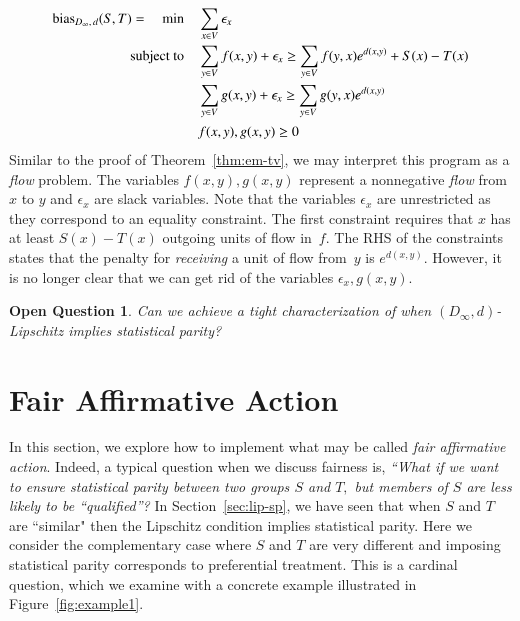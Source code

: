 \documentclass[letterpaper,11pt]{article}
\newcommand{\authnote}[2]{{ \footnotesize \bf{\color{red}[#1's Note: {\color{blue}#2}]}}}
\newcommand{\authnote}[2]{}
\newtheorem{open}{Open Question}[section]
\theoremstyle{definition}
\newcommand{\Mnote}[1]{{\authnote{Moritz} {#1}}}
\newcommand\bias{\mathrm{bias}}
\newcommand\dtoDinfty{D_\infty,\, d}
\begin{document}
\begin{align}
\bias_{\dtoDinfty}(S,T)
=
\quad\min\quad & \sum_{x\in V} \epsilon_x \notag \\
\label{eq:f}
\text{subject to}\quad
& \sum_{y\in V}f(x,y)+\epsilon_x
\ge \sum_{y\in V}f(y,x)e^{d(x,y)}+S(x)-T(x) \\
\label{eq:g}
& \sum_{y\in V}g(x,y)+\epsilon_x
\ge \sum_{y\in V}g(y,x)e^{d(x,y)} \\
& f(x,y),g(x,y)\ge0 \notag
\end{align}
%
Similar to the proof of Theorem~\ref{thm:em-tv}, we may interpret this program as
a \emph{flow} problem.  The variables $f(x,y), g(x,y)$ represent a
nonnegative \emph{flow} from $x$ to $y$ and
$\epsilon_x$ are slack variables. Note that the variables $\epsilon_x$ are
unrestricted as they correspond to an equality constraint. The first
constraint requires that $x$ has at least $S(x)-T(x)$ outgoing units of
flow in~$f.$ The
RHS of the constraints states that the penalty for \emph{receiving} a unit of
flow from~$y$ is $e^{d(x,y)}.$ However, it is no longer clear that we can
get rid of the variables $\epsilon_x,g(x,y).$

\begin{open}
Can we achieve a tight characterization of when $(D_\infty,d)$-Lipschitz
implies statistical parity?
\end{open}

\section{Fair Affirmative Action}
\label{sec:preferential}


In this section, we explore how to implement what may be called \emph{fair
affirmative action}. Indeed, a typical question when we discuss fairness
is, \emph{``What if we want to ensure statistical parity between two groups
$S$ and $T,$ but members of $S$ are less likely to be ``qualified''?}
In
Section~\ref{sec:lip-sp}, we have seen that when $S$ and $T$  are
``similar" then the Lipschitz condition implies statistical parity. Here we
consider the complementary case where $S$ and  $T$ are very different and
imposing statistical parity corresponds to preferential  treatment.
This is a cardinal question, which we examine with
a concrete example illustrated in Figure~\ref{fig:example1}.
\end{document}
